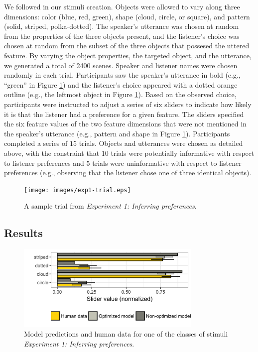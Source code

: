\documentclass[10pt,a4paper]{article}
\begin{document}
We followed  in our stimuli creation. Objects were allowed to vary along three dimensions: color (blue, red, green), shape (cloud, circle, or square), and pattern (solid, striped, polka-dotted). The speaker's utterance was chosen at random from the properties of the three objects present, and the listener's choice was chosen at random from the subset of the three objects that possesed the uttered feature. By varying the object properties, the targeted object, and the utterance, we generated a total of 2400 scenes. Speaker and listener names were chosen randomly in each trial. Participants saw the speaker's utterance in bold (e.g., ``green'' in Figure \ref{exp1-trial}) and the listener's choice appeared with a dotted orange outline (e.g., the leftmost object in Figure \ref{exp1-trial}). Based on the observed choice, participants were instructed to adjust a series of six sliders to indicate how likely it is that the listener had a preference for a given feature. The sliders specified the six feature values of the two feature dimensions that were not mentioned in the speaker's utterance (e.g., pattern and shape in Figure \ref{exp1-trial}). Participants completed a series of $15$ trials. Objects and utterances were chosen as detailed above, with the constraint that 10 trials were potentially informative with respect to listener preferences and 5 trials were uninformative with respect to listener preferences (e.g., observing that the listener chose one of three identical objects). 


\begin{figure}[ht!]
	\centering
	\texttt{[image: images/exp1-trial.eps]}
	\caption{A sample trial from \emph{Experiment 1: Inferring preferences}.}\label{exp1-trial}
\end{figure}

\subsection{Results}

\begin{figure}[ht!]
	\centering
	\includegraphics[width=3.5in]{images/X4-example-simple-model-CogSci.png}
	\caption{Model predictions and human data for one of the classes of stimuli \emph{Experiment 1: Inferring preferences}.}\label{slider-barplot-4}
\end{figure}
\end{document}
